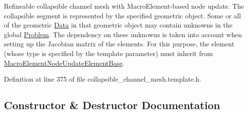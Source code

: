 Refineable collapsible channel mesh with Macro\+Element-\/based node update. The collapsible segment is represented by the specified geometric object. Some or all of the geometric \hyperlink{classoomph_1_1Data}{Data} in that geometric object may contain unknowns in the global \hyperlink{classoomph_1_1Problem}{Problem}. The dependency on these unknowns is taken into account when setting up the Jacobian matrix of the elements. For this purpose, the element (whose type is specified by the template parameter) must inherit from \hyperlink{classoomph_1_1MacroElementNodeUpdateElementBase}{Macro\+Element\+Node\+Update\+Element\+Base}. 

Definition at line 375 of file collapsible\+\_\+channel\+\_\+mesh.\+template.\+h.



\subsection{Constructor \& Destructor Documentation}
\mbox{\label{classoomph_1_1MacroElementNodeUpdateRefineableCollapsibleChannelMesh_a6e3dfbb3d4dee7897d59aa10cde2dab1}} 
